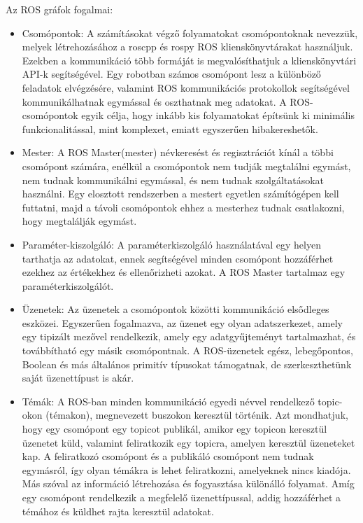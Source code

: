 \documentclass{article}
\begin{document}
Az ROS gráfok fogalmai:
\begin{itemize}
    \item Csomópontok: A számításokat végző folyamatokat csomópontoknak nevezzük, melyek létrehozásához a roscpp és rospy ROS klienskönyvtárakat használjuk. Ezekben a kommunikáció több formáját is megvalósíthatjuk a klienskönyvtári API-k segítségével. Egy robotban számos csomópont lesz a különböző feladatok elvégzésére, valamint ROS kommunikációs protokollok segítségével kommunikálhatnak egymással és oszthatnak meg adatokat. A ROS-csomópontok egyik célja, hogy inkább kis folyamatokat építsünk ki minimális funkcionalitással, mint komplexet, emiatt egyszerűen hibakereshetők.
    \item Mester: A ROS Master(mester) névkeresést és regisztrációt kínál a többi csomópont számára, enélkül a csomópontok nem tudják megtalálni egymást, nem tudnak kommunikálni egymással, és nem tudnak szolgáltatásokat használni. Egy elosztott rendszerben a mestert egyetlen számítógépen kell futtatni, majd a távoli csomópontok ehhez a mesterhez tudnak csatlakozni, hogy megtalálják egymást.
    \item  Paraméter-kiszolgáló: A paraméterkiszolgáló használatával egy helyen tarthatja az adatokat, ennek segítségével minden csomópont hozzáférhet ezekhez az értékekhez és ellenőrizheti azokat. A ROS Master tartalmaz egy paraméterkiszolgálót.
    \item Üzenetek: Az üzenetek a csomópontok közötti kommunikáció elsődleges eszközei. Egyszerűen fogalmazva, az üzenet egy olyan adatszerkezet, amely egy tipizált mezővel rendelkezik, amely egy adatgyűjteményt tartalmazhat, és továbbítható egy másik csomópontnak. A ROS-üzenetek egész, lebegőpontos, Boolean és más általános primitív típusokat támogatnak, de szerkeszthetünk saját üzenettípust is akár.
    \item Témák: A ROS-ban minden kommunikáció egyedi névvel rendelkező topic-okon (témakon), megnevezett buszokon keresztül történik. Azt mondhatjuk, hogy egy csomópont egy topicot publikál, amikor egy topicon keresztül üzenetet küld, valamint feliratkozik egy topicra, amelyen keresztül üzeneteket kap. A feliratkozó csomópont és a publikáló csomópont nem tudnak egymásról, így olyan témákra is lehet feliratkozni, amelyeknek nincs kiadója. Más szóval az információ létrehozása és fogyasztása különálló folyamat. Amíg egy csomópont rendelkezik a megfelelő üzenettípussal, addig hozzáférhet a témához és küldhet rajta keresztül adatokat.

\end{itemize}
\end{document}
